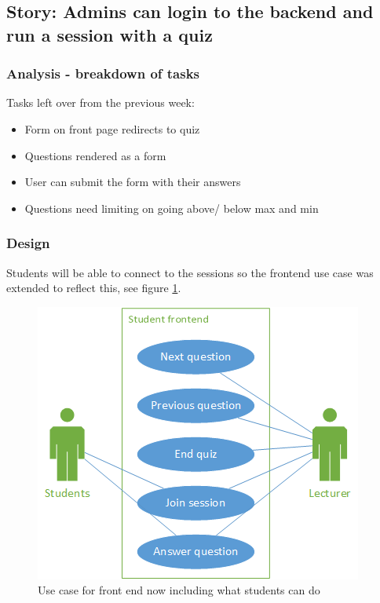 \subsection{Story: Admins can login to the backend and run a session with a quiz}
\subsubsection{Analysis - breakdown of tasks}
Tasks left over from the previous week:
\begin{itemize}
	\item Form on front page redirects to quiz
	\item Questions rendered as a form
	\item User can submit the form with their answers
	\item Questions need limiting on going above/ below max and min
\end{itemize}
\subsubsection{Design}
Students will be able to connect to the sessions so the frontend use case was extended to reflect this, see figure \ref{fig:iter-5-frontend-use-case}.

\begin{figure}[H]
	\caption{Use case for front end now including what students can do}
	\centerline{\includegraphics{Chapter2/Iter-5/iter-5-frontend-use-case}}
	\label{fig:iter-5-frontend-use-case}
\end{figure}

